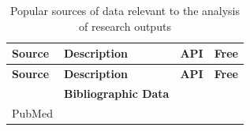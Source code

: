 \documentclass[]{krantz}
\begin{document}
\begin{longtable}[]{@{}llcc@{}}
\caption{\label{tab:table2-1} Popular sources of data relevant to the
analysis of research outputs}\tabularnewline
\toprule
\begin{minipage}[b]{0.10\columnwidth}\raggedright\strut
\textbf{Source}\strut
\end{minipage} & \begin{minipage}[b]{0.74\columnwidth}\raggedright\strut
\textbf{Description}\strut
\end{minipage} & \begin{minipage}[b]{0.02\columnwidth}\centering\strut
\textbf{API}\strut
\end{minipage} & \begin{minipage}[b]{0.02\columnwidth}\centering\strut
\textbf{Free}\strut
\end{minipage}\tabularnewline
\midrule
\endfirsthead
\toprule
\begin{minipage}[b]{0.10\columnwidth}\raggedright\strut
\textbf{Source}\strut
\end{minipage} & \begin{minipage}[b]{0.74\columnwidth}\raggedright\strut
\textbf{Description}\strut
\end{minipage} & \begin{minipage}[b]{0.02\columnwidth}\centering\strut
\textbf{API}\strut
\end{minipage} & \begin{minipage}[b]{0.02\columnwidth}\centering\strut
\textbf{Free}\strut
\end{minipage}\tabularnewline
\midrule
\endhead
\begin{minipage}[t]{0.10\columnwidth}\raggedright\strut
\strut
\end{minipage} & \begin{minipage}[t]{0.74\columnwidth}\raggedright\strut
\textbf{Bibliographic Data}\strut
\end{minipage} & \begin{minipage}[t]{0.02\columnwidth}\centering\strut
\strut
\end{minipage} & \begin{minipage}[t]{0.02\columnwidth}\centering\strut
\strut
\end{minipage}\tabularnewline
\begin{minipage}[t]{0.10\columnwidth}\raggedright\strut
PubMed\strut
\end{minipage} & \begin{minipage}[t]{0.74\columnwidth}\raggedright\strut

\end{minipage}
\end{longtable}
\end{document}
